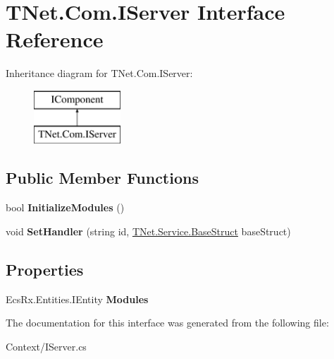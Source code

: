 \hypertarget{interface_t_net_1_1_com_1_1_i_server}{}\section{T\+Net.\+Com.\+I\+Server Interface Reference}
\label{interface_t_net_1_1_com_1_1_i_server}
Inheritance diagram for T\+Net.\+Com.\+I\+Server\+:\begin{figure}[H]
\begin{center}
\leavevmode
\includegraphics[height=2.000000cm]{interface_t_net_1_1_com_1_1_i_server}
\end{center}
\end{figure}
\subsection*{Public Member Functions}
\begin{DoxyCompactItemize}
\item 
\mbox{\label{interface_t_net_1_1_com_1_1_i_server_ac1785881f6799a7bef1fccf9eda2e56e}} 
bool {\bfseries Initialize\+Modules} ()
\item 
\mbox{\label{interface_t_net_1_1_com_1_1_i_server_a82a35b8f1d3a76102e9eb73853057350}} 
void {\bfseries Set\+Handler} (string id, \mbox{\hyperlink{class_t_net_1_1_service_1_1_base_struct}{T\+Net.\+Service.\+Base\+Struct}} base\+Struct)
\end{DoxyCompactItemize}
\subsection*{Properties}
\begin{DoxyCompactItemize}
\item 
\mbox{\label{interface_t_net_1_1_com_1_1_i_server_aa2d54f4021239f6c9ef0fd24b321f5be}} 
Ecs\+Rx.\+Entities.\+I\+Entity {\bfseries Modules}
\end{DoxyCompactItemize}


The documentation for this interface was generated from the following file\+:\begin{DoxyCompactItemize}
\item 
Context/I\+Server.\+cs\end{DoxyCompactItemize}
